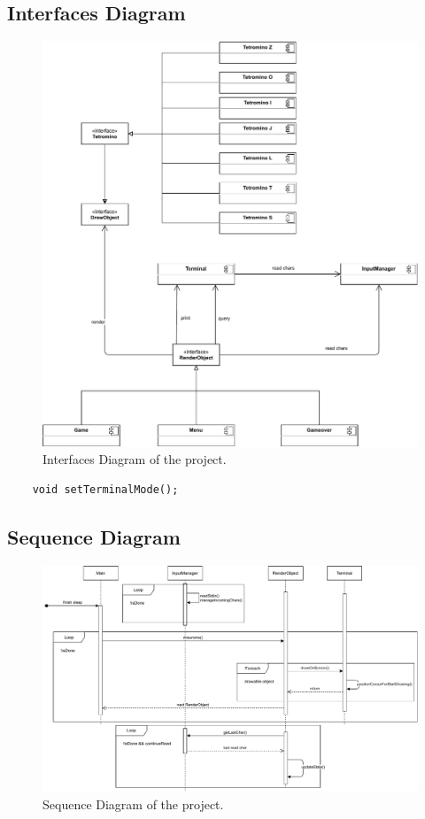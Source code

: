 \documentclass{article}
\begin{document}
\subsection{Interfaces Diagram}
\begin{figure}[H]
    \centering
    \includegraphics[width=\linewidth]{img/InterafcesDiagram.pdf}
    \caption{Interfaces Diagram of the project.}
    \label{fig:interface}
\end{figure}
\begin{verbatim}
    void setTerminalMode();
\end{verbatim}

\subsection{Sequence Diagram}
\begin{figure}[H]
    \centering
    \includegraphics[width=\linewidth]{img/SequenceDiagram.pdf}
    \caption{Sequence Diagram of the project.}
    \label{fig:sequence}
\end{figure}
\end{document}
